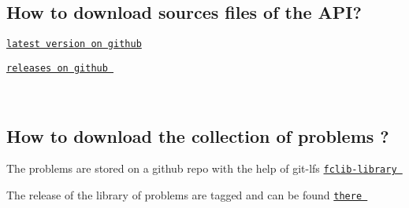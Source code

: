 \hypertarget{download_howtosources}{}\subsection{How to download sources files of the A\+P\+I?}\label{download_howtosources}

\begin{DoxyItemize}
\item \href{https://github.com/FrictionalContactLibrary/fclib}{\tt latest version on github} 
\item \href{https://github.com/FrictionalContactLibrary/fclib/releases}{\tt releases on github } 
\end{DoxyItemize}

~\newline
 \hypertarget{download_howtolibrary}{}\subsection{How to download the collection of problems ?}\label{download_howtolibrary}

\begin{DoxyItemize}
\item The problems are stored on a github repo with the help of git-\/lfs \href{https://github.com/FrictionalContactLibrary/fclib-library}{\tt fclib-\/library }  
\item The release of the library of problems are tagged and can be found \href{https://github.com/FrictionalContactLibrary/fclib-library/releases}{\tt there }  ~\newline
 
\end{DoxyItemize}